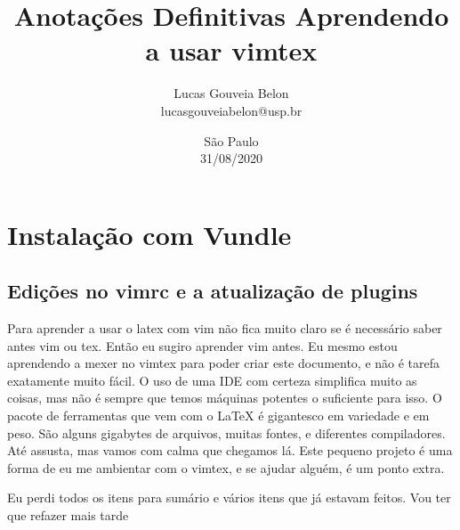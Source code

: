 \documentclass[a4paper, 12pt]{article}
\begin{document}
\title{
    \textbf{
    Anotações Definitivas
    }
    \break
    Aprendendo a usar vimtex
}
\author{
    Lucas Gouveia Belon
    \\
    lucasgouveiabelon@usp.br
}

\date{\vspace{2.2cm}São Paulo\\31/08/2020}

\maketitle
\newpage
\tableofcontents
\newpage
\section{Instalação com Vundle}
\subsection{Edições no vimrc e a atualização de plugins}

Para aprender a usar o latex com vim não fica muito claro se é necessário saber antes vim ou tex. Então eu sugiro aprender vim antes. Eu mesmo estou aprendendo a mexer no vimtex para poder criar este documento, e não é tarefa exatamente muito fácil. O uso de uma IDE com certeza simplifica muito as coisas, mas não é sempre que temos máquinas potentes o suficiente para isso. O pacote de ferramentas que vem com o \LaTeX \hspace{0.5cm} é gigantesco em variedade e em peso. São alguns gigabytes de arquivos, muitas fontes, e diferentes compiladores. Até assusta, mas vamos com calma que chegamos lá. Este pequeno projeto é uma forma de eu me ambientar com o vimtex, e se ajudar alguém, é um ponto extra.

Eu perdi todos os itens para sumário e vários itens que já estavam feitos.
Vou ter que refazer mais tarde
\end{document}
